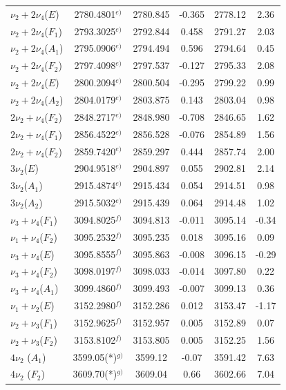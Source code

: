 \begin{longtable}{lccccc}
$\nu_2+2\nu_4$($E  $) & 2780.4801$^{e)}$ & 2780.845 & -0.365 & 2778.12 & 2.36 \\
$\nu_2+2\nu_4$($F_1$) & 2793.3025$^{e)}$ & 2792.844 & 0.458 & 2791.27 & 2.03 \\
$\nu_2+2\nu_4$($A_1$) & 2795.0906$^{e)}$ & 2794.494 & 0.596 & 2794.64 & 0.45 \\
$\nu_2+2\nu_4$($F_2$) & 2797.4098$^{e)}$ & 2797.537 & -0.127 & 2795.33 & 2.08 \\
$\nu_2+2\nu_4$($E  $) & 2800.2094$^{e)}$ & 2800.504 & -0.295 & 2799.22 & 0.99 \\
$\nu_2+2\nu_4$($A_2$) & 2804.0179$^{e)}$ & 2803.875 & 0.143 & 2803.04 & 0.98 \\
$2\nu_2+\nu_4$($F_2$) & 2848.2717$^{e)}$ & 2848.980 & -0.708 & 2846.65 & 1.62 \\
$2\nu_2+\nu_4$($F_1$) & 2856.4522$^{e)}$ & 2856.528 & -0.076 & 2854.89 & 1.56 \\
$2\nu_2+\nu_4$($F_2$) & 2859.7420$^{e)}$ & 2859.297 & 0.444 & 2857.74 & 2.00 \\
$3\nu_2$($E  $) & 2904.9518$^{e)}$ & 2904.897 & 0.055 & 2902.81 & 2.14 \\
$3\nu_2$($A_1$) & 2915.4874$^{e)}$ & 2915.434 & 0.054 & 2914.51 & 0.98 \\
$3\nu_2$($A_2$) & 2915.5032$^{e)}$ & 2915.439 & 0.064 & 2914.48 & 1.02 \\
$\nu_3+ \nu_4$($F_1$) & 3094.8025$^{f)}$ & 3094.813 & -0.011 & 3095.14 & -0.34 \\
$\nu_1+ \nu_4$($F_2$) & 3095.2532$^{f)}$ & 3095.235 & 0.018 & 3095.16 & 0.09 \\
$\nu_3+ \nu_4$($E  $) & 3095.8555$^{f)}$ & 3095.863 & -0.008 & 3096.15 & -0.29 \\
$\nu_3+ \nu_4$($F_2$) & 3098.0197$^{f)}$ & 3098.033 & -0.014 & 3097.80 & 0.22 \\
$\nu_3+ \nu_4$($A_1$) & 3099.4860$^{f)}$ & 3099.493 & -0.007 & 3099.13 & 0.36 \\
$\nu_1+ \nu_2$($E  $) & 3152.2980$^{f)}$ & 3152.286 & 0.012 & 3153.47 & -1.17 \\
$\nu_2+ \nu_3$($F_1$) & 3152.9625$^{f)}$ & 3152.957 & 0.005 & 3152.89 & 0.07 \\
$\nu_2+ \nu_3$($F_2$) & 3153.8102$^{f)}$ & 3153.805 & 0.005 & 3152.25 & 1.56 \\
$4\nu_2      $ ($A_1$) & 3599.05(*)$^{g)}$ & 3599.12 & -0.07 & 3591.42 & 7.63 \\
$4\nu_2      $ ($F_2$) & 3609.70(*)$^{g)}$ & 3609.04 & 0.66 & 3602.66 & 7.04 \\

\end{longtable}
